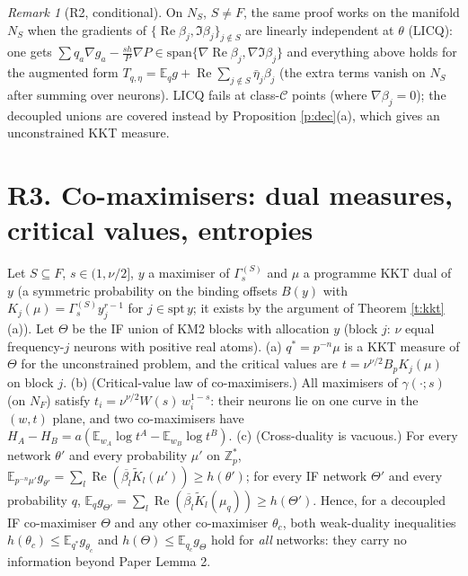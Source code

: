 \documentclass[11pt]{article}
\theoremstyle{remark}\newtheorem{remark}[theorem]{Remark}
\newcommand{\E}{\mathbb E}\newcommand{\R}{\mathbb R}\newcommand{\Re}{\operatorname{Re}}
\begin{document}
\begin{remark}[R2, conditional]
On $N_S$, $S\ne F$, the same proof works on the manifold $N_S$ when the gradients of $\{\Re\beta_j,\Im\beta_j\}_{j\notin S}$ are linearly independent at $\theta$
(LICQ): one gets $\sum q_a\nabla g_a-\frac{sh}P\nabla P\in\mathrm{span}\{\nabla\Re\beta_j,\nabla\Im\beta_j\}$ and everything above holds for the augmented form
$T_{q,\eta}=\E_q g+\Re\sum_{j\notin S}\bar\eta_j\beta_j$ (the extra terms vanish on $N_S$ after summing over neurons). LICQ fails at class-$\mathcal C$ points
(where $\nabla\beta_j=0$); the decoupled unions are covered instead by Proposition \ref{p:dec}(a), which gives an unconstrained KKT measure.
\end{remark}

\section{R3. Co-maximisers: dual measures, critical values, entropies}
\begin{proposition}\label{p:dec}
Let $S\subseteq F$, $s\in(1,\nu/2]$, $y$ a maximiser of $\Gamma^{(S)}_s$ and $\mu$ a programme KKT dual of $y$ (a symmetric probability on the
binding offsets $B(y)$ with $K_j(\mu)=\Gamma^{(S)}_sy_j^{r-1}$ for $j\in\mathrm{spt}\,y$; it exists by the argument of Theorem \ref{t:kkt}(a)).
Let $\Theta$ be the IF union of KM2 blocks with allocation $y$ (block $j$: $\nu$ equal frequency-$j$ neurons with positive real atoms).
(a) $q^*=p^{-n}\mu$ is a KKT measure of $\Theta$ for the unconstrained problem, and the critical values are $t=\nu^{\nu/2}B_pK_j(\mu)$ on block $j$.
(b) (Critical-value law of co-maximisers.) All maximisers of $\gamma(\cdot;s)$ (on $N_F$) satisfy $t_i=\nu^{\nu/2}W(s)\,w_i^{1-s}$: their neurons lie on one curve
in the $(w,t)$ plane, and two co-maximisers have $H_A-H_B=a(\E_{w_A}\log t^A-\E_{w_B}\log t^B)$.
(c) (Cross-duality is vacuous.) For every network $\theta'$ and every probability $\mu'$ on $\mathbb Z_p^*$, $\E_{p^{-n}\mu'}g_{\theta'}=\sum_l\Re(\overline{\beta_l}\tilde K_l(\mu'))\ge h(\theta')$;
for every IF network $\Theta'$ and every probability $q$, $\E_qg_{\Theta'}=\sum_l\Re(\overline{\beta_l}\tilde K_l(\mu_q))\ge h(\Theta')$.
Hence, for a decoupled IF co-maximiser $\Theta$ and any other co-maximiser $\theta_c$, both weak-duality inequalities $h(\theta_c)\le\E_{q^*}g_{\theta_c}$ and
$h(\Theta)\le\E_{q_c}g_\Theta$ hold for \emph{all} networks: they carry no information beyond Paper Lemma 2.
\end{proposition}
\end{document}
